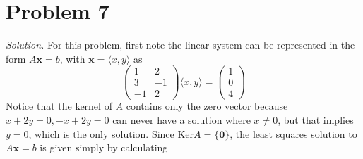 \documentclass{article}
\begin{document}
\section*{Problem 7}
\emph{Solution. }For this problem, first note the linear system can be represented in the form $A\mathbf{x} = b$, with $\mathbf{x} = \langle x,y\rangle$ as
\begin{equation*}
    \begin{pmatrix}
        1 & 2\\
        3 & -1\\
        -1 & 2
    \end{pmatrix} \langle x, y\rangle = \begin{pmatrix}
        1\\
        0\\
        4
    \end{pmatrix}
\end{equation*}
Notice that the kernel of $A$ contains only the zero vector because $x + 2y = 0, -x + 2y = 0$ can never have a solution where $x \neq 0$, but that implies $y = 0$, which is the only solution. Since $\text{Ker}A = \{\mathbf{0}\}$, the least squares solution to $A\mathbf{x} = b$ is given simply by calculating
\end{document}
